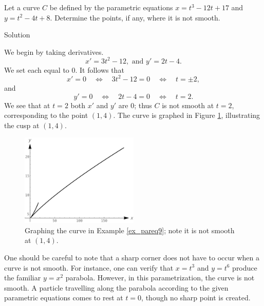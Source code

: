 \begin{example}\label{ex_pareq9}
Let a curve $C$ be defined by the parametric equations $x=t^3-12t+17$ and $y=t^2-4t+8$. Determine the points, if any, where it is not smooth.

Solution 

We begin by taking derivatives. 
$$x' = 3t^2-12,\text{ and } y' = 2t-4.$$
We set each equal to 0. It follows that 
$$
x' = 0 \quad\Leftrightarrow\quad 3t^2-12=0 \quad\Leftrightarrow\quad t=\pm 2,
$$
and
$$
  y'=0 \quad\Leftrightarrow\quad 2t-4 = 0 \quad\Leftrightarrow\quad t=2.
	$$
We see that at $t=2$ both $x'$ and $y'$ are 0; thus $C$ is not smooth at $t=2$, corresponding to the point $(1,4)$. The curve is graphed in Figure \ref{fig_parametric_21}, illustrating the cusp at $(1,4)$.


\begin{figure}[H]
	\begin{center}
			\includegraphics[width=0.5\textwidth]{fig_parametric_21}
	\caption{Graphing the curve in Example \ref{ex_pareq9}; note it is not smooth at $(1,4)$.}
	\label{fig_parametric_21}
	\end{center}
\end{figure}


\end{example}

One should be careful to note that a sharp corner does not have to occur when a curve is not smooth. For instance, one can verify that $x=t^3$ and $y=t^6$ produce the familiar $y=x^2$ parabola. However, in this parametrization, the curve is not smooth. A particle travelling along the parabola according to the given parametric equations comes to rest at $t=0$, though no sharp point is created.

